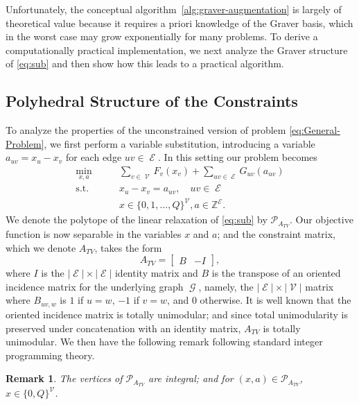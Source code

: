 \documentclass[pdflatex,sn-mathphys-num]{sn-jnl}%
\newtheorem{remark}{Remark}
\DeclareMathOperator{\Gcal}{\mathcal{G}}
\DeclareMathOperator{\Ecal}{\mathcal{E}}
\DeclareMathOperator{\Vcal}{\mathcal{V}}
\begin{document}
Unfortunately, the conceptual algorithm~\ref{alg:graver-augmentation} is largely of theoretical value because it requires a priori knowledge of the Graver basis, which in the worst case may grow exponentially for many problems. To derive a computationally practical implementation, we next analyze the Graver structure of \eqref{eq:sub} and then show how this leads to a practical algorithm.

\subsection{Polyhedral Structure of the Constraints}
To analyze the properties of the unconstrained version of problem \eqref{eq:General-Problem}, we first perform a variable substitution, introducing a variable $a_{uv} = x_u - x_v$ for each edge $uv \in \Ecal$. In this setting our problem becomes
\begin{subequations}
\begin{align}
    \min_{x,a} \qquad &\sum_{v \in \Vcal} F_v(x_v) + \sum_{uv \in \Ecal} G_{uv}(a_{uv}) \\
    \text{s.t.} \qquad & x_u - x_v = a_{uv}, \quad uv \in \Ecal \\
                & x \in \{0,1,\ldots,Q\}^{\Vcal}, a \in \mathbb{Z}^{\Ecal} .
\end{align}\label{eq:sub}%
\end{subequations}
We denote the polytope of the linear relaxation of \eqref{eq:sub} by $\mathcal{P}_{A_{TV}}$.
Our objective function is now separable in the variables $x$ and $a$; and the constraint matrix, which we denote $A_{TV}$, takes the form
\begin{equation}
    A_{TV} = \begin{bmatrix} B & -I \end{bmatrix},
\end{equation}
where $I$ is the $|\Ecal| \times |\Ecal|$ identity matrix and $B$ is the transpose of an oriented incidence matrix for the underlying graph $\Gcal$, namely, the $|\Ecal| \times |\Vcal|$ matrix where $B_{uv,w}$ is $1$ if $u=w$, $-1$ if $v = w$, and $0$ otherwise.
It is well known that the oriented incidence matrix is totally unimodular; and since total unimodularity is preserved under concatenation with an identity matrix, $A_{TV}$ is totally unimodular. We then have the following remark following standard integer programming theory.
\begin{remark}\label{rmk:verts-are-integral}
    The vertices of $\mathcal{P}_{A_{TV}}$ are integral; and for $(x, a) \in \mathcal{P}_{A_{TV}}$, $x \in \{0,Q\}^{\Vcal}$.
\end{remark}
\end{document}
